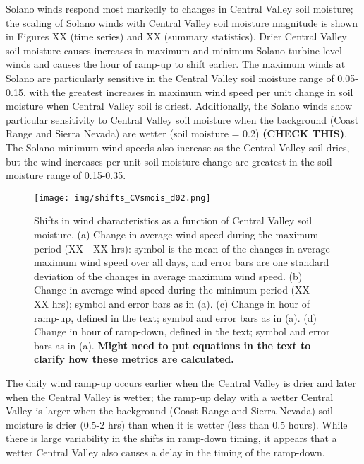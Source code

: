 Solano winds respond most markedly to changes in Central Valley soil moisture; the scaling of Solano winds with Central Valley soil moisture magnitude is shown in Figures XX (time series) and XX (summary statistics).  Drier Central Valley soil moisture causes increases in maximum and minimum Solano turbine-level winds and causes the hour of ramp-up to shift earlier.  The maximum winds at Solano are particularly sensitive in the Central Valley soil moisture range of 0.05-0.15, with the greatest increases in maximum wind speed per unit change in soil moisture when Central Valley soil is driest.  Additionally, the Solano winds show particular sensitivity to Central Valley soil moisture when the background (Coast Range and Sierra Nevada) are wetter (soil moisture = 0.2) \textbf{(CHECK THIS)}.  The Solano minimum wind speeds also increase as the Central Valley soil dries, but the wind increases per unit soil moisture change are greatest in the soil moisture range of 0.15-0.35.


\begin{figure}[here]
\texttt{[image: img/shifts\_CVsmois\_d02.png]}
\caption{Shifts in wind characteristics as a function of Central Valley soil moisture.  (a) Change in average wind speed during the maximum period (XX - XX hrs): symbol is the mean of the changes in average maximum wind speed over all days, and error bars are one standard deviation of the changes in average maximum wind speed.  (b) Change in average wind speed during the minimum period (XX - XX hrs); symbol and error bars as in (a).  (c) Change in hour of ramp-up, defined in the text; symbol and error bars as in (a).  (d) Change in hour of ramp-down, defined in the text; symbol and error bars as in (a).  \textbf{Might need to put equations in the text to clarify how these metrics are calculated.}}
\label{fig:windSol_WindShiftsCV}
\end{figure}

The daily wind ramp-up occurs earlier when the Central Valley is drier and later when the Central Valley is wetter; the ramp-up delay with a wetter Central Valley is larger when the background (Coast Range and Sierra Nevada) soil moisture is drier (0.5-2 hrs) than when it is wetter (less than 0.5 hours).  While there is large variability in the shifts in ramp-down timing, it appears that a wetter Central Valley also causes a delay in the timing of the ramp-down.

